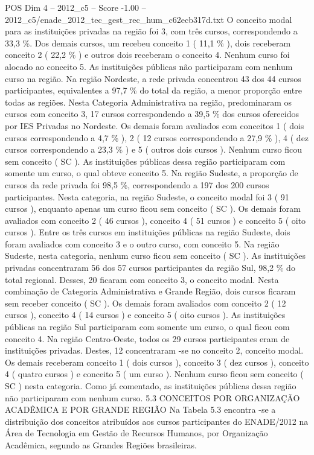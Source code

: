 \begin{textsample}{POS Dim 4 – 2012\_c5 – Score -1.00 – 2012\_c5/enade\_2012\_tec\_gest\_rec\_hum\_c62ecb317d.txt}
O conceito modal para as instituições privadas na região foi 3, com três cursos, correspondendo a 33,3 \%.
Dos demais cursos, um recebeu conceito 1 ( 11,1 \% ), dois receberam conceito 2 ( 22,2 \% ) e outros dois receberam o conceito 4.
Nenhum curso foi alocado ao conceito 5.
As instituições públicas não participaram com nenhum curso na região.
Na região Nordeste, a rede privada concentrou 43 dos 44 cursos participantes, equivalentes a 97,7 \% do total da região, a menor proporção entre todas as regiões.
Nesta Categoria Administrativa na região, predominaram os cursos com conceito 3, 17 cursos correspondendo a 39,5 \% dos cursos oferecidos por IES Privadas no Nordeste.
Os demais foram avaliados com conceitos 1 ( dois cursos correspondendo a 4,7 \% ), 2 ( 12 cursos correspondendo a 27,9 \% ), 4 ( dez cursos correspondendo a 23,3 \% ) e 5 ( outros dois cursos ).
Nenhum curso ficou sem conceito ( SC ).
As instituições públicas dessa região participaram com somente um curso, o qual obteve conceito 5.
Na região Sudeste, a proporção de cursos da rede privada foi 98,5 \%, correspondendo a 197 dos 200 cursos participantes.
Nesta categoria, na região Sudeste, o conceito modal foi 3 ( 91 cursos ), enquanto apenas um curso ficou sem conceito ( SC ).
Os demais foram avaliados com conceito 2 ( 46 cursos ), conceito 4 ( 51 cursos ) e conceito 5 ( oito cursos ).
Entre os três cursos em instituições públicas na região Sudeste, dois foram avaliados com conceito 3 e o outro curso, com conceito 5.
Na região Sudeste, nesta categoria, nenhum curso ficou sem conceito ( SC ).
As instituições privadas concentraram 56 dos 57 cursos participantes da região Sul, 98,2 \% do total regional.
Desses, 20 ficaram com conceito 3, o conceito modal.
Nesta combinação de Categoria Administrativa e Grande Região, dois cursos ficaram sem receber conceito ( SC ).
Os demais foram avaliados com conceito 2 ( 12 cursos ), conceito 4 ( 14 cursos ) e conceito 5 ( oito cursos ).
As instituições públicas na região Sul participaram com somente um curso, o qual ficou com conceito 4.
Na região Centro-Oeste, todos os 29 cursos participantes eram de instituições privadas.
Destes, 12 concentraram -se no conceito 2, conceito modal.
Os demais receberam conceito 1 ( dois cursos ), conceito 3 ( dez cursos ), conceito 4 ( quatro cursos ) e conceito 5 ( um curso ).
Nenhum curso ficou sem conceito ( SC ) nesta categoria.
Como já comentado, as instituições públicas dessa região não participaram com nenhum curso. 5.3 CONCEITOS POR ORGANIZAÇÃO ACADÊMICA E POR GRANDE REGIÃO Na Tabela 5.3 encontra -se a distribuição dos conceitos atribuídos aos cursos participantes do ENADE/2012 na Área de Tecnologia em Gestão de Recursos Humanos, por Organização Acadêmica, segundo as Grandes Regiões brasileiras.

\end{textsample}
